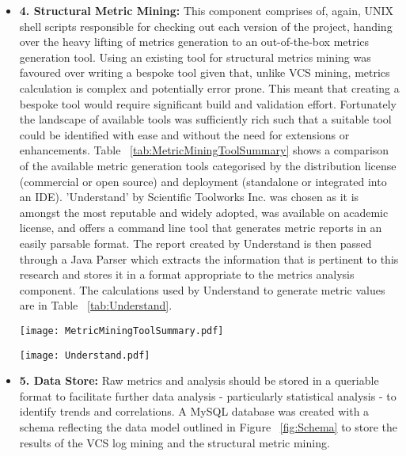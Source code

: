 \begin{itemize}
\item \textbf{4. Structural Metric Mining:} This component comprises of, again, UNIX shell scripts responsible for checking out each version of the project, handing over the heavy lifting of metrics generation to an out-of-the-box metrics generation tool. Using an existing tool for structural metrics mining was favoured over writing a bespoke tool given that, unlike VCS mining, metrics calculation is complex and potentially error prone. This meant that creating a bespoke tool would require significant build and validation effort. Fortunately the landscape of available tools was sufficiently rich such that a suitable tool could be identified with ease and without the need for extensions or enhancements. Table ~\ref{tab:MetricMiningToolSummary} shows a comparison of the available metric generation tools categorised by the distribution license (commercial or open source) and deployment (standalone or integrated into an IDE). 'Understand' by Scientific Toolworks Inc. was chosen as it is amongst the most reputable and widely adopted, was available on academic license, and offers a command line tool that generates metric reports in an easily parsable format. The report created by Understand is then passed through a Java Parser which extracts the information that is pertinent to this research and stores it in a format appropriate to the metrics analysis component. The calculations used by Understand to generate metric values are in Table ~\ref{tab:Understand}.

\begin{table}
\centering 
{}
\begin{tabular}
 \centering 
 \texttt{[image: MetricMiningToolSummary.pdf]}
 \label{tab:MetricMiningToolSummary}
\end{tabular}
\end{table}

\begin{table}
\centering 
{}
\begin{tabular}
 \centering 
 \texttt{[image: Understand.pdf]}
 \label{tab:Understand}
\end{tabular}
\end{table}

\item \textbf{5. Data Store:} Raw metrics and analysis should be stored in a queriable format to facilitate further data analysis - particularly statistical analysis - to identify trends and correlations. A MySQL database was created with a schema reflecting the data model outlined in Figure ~\ref{fig:Schema} to store the results of the VCS log mining and the structural metric mining. 
 

\end{itemize}
